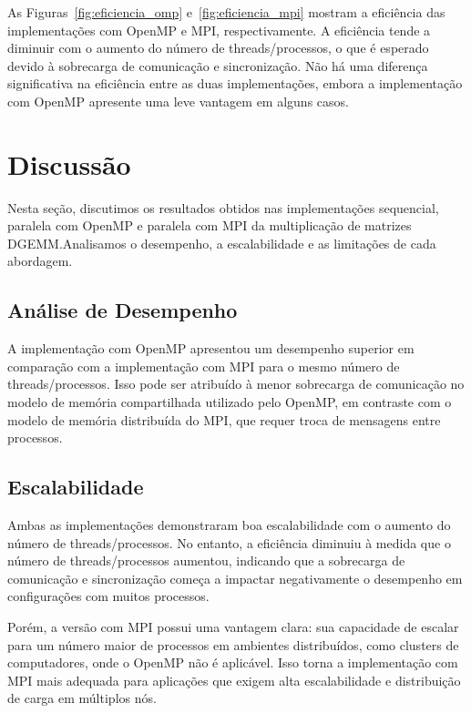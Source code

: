 \documentclass[12pt, a4paper]{article}
\begin{document}
    As Figuras~\ref{fig:eficiencia_omp} e~\ref{fig:eficiencia_mpi} mostram a eficiência das implementações com OpenMP e MPI, respectivamente. A eficiência tende a diminuir com o aumento do número de threads/processos, o que é esperado devido à sobrecarga de comunicação e sincronização. Não há uma diferença significativa na eficiência entre as duas implementações, embora a implementação com OpenMP apresente uma leve vantagem em alguns casos.

    \newpage
    \section{Discussão}\label{sec:discussao}

    Nesta seção, discutimos os resultados obtidos nas implementações sequencial, paralela com OpenMP e paralela com MPI da multiplicação de matrizes DGEMM.\@ Analisamos o desempenho, a escalabilidade e as limitações de cada abordagem.

    \subsection{Análise de Desempenho}

    A implementação com OpenMP apresentou um desempenho superior em comparação com a implementação com MPI para o mesmo número de threads/processos. Isso pode ser atribuído à menor sobrecarga de comunicação no modelo de memória compartilhada utilizado pelo OpenMP, em contraste com o modelo de memória distribuída do MPI, que requer troca de mensagens entre processos.

    \subsection{Escalabilidade}

    Ambas as implementações demonstraram boa escalabilidade com o aumento do número de threads/processos. No entanto, a eficiência diminuiu à medida que o número de threads/processos aumentou, indicando que a sobrecarga de comunicação e sincronização começa a impactar negativamente o desempenho em configurações com muitos processos.

    Porém, a versão com MPI possui uma vantagem clara: sua capacidade de escalar para um número maior de processos em ambientes distribuídos, como clusters de computadores, onde o OpenMP não é aplicável. Isso torna a implementação com MPI mais adequada para aplicações que exigem alta escalabilidade e distribuição de carga em múltiplos nós.
\end{document}
